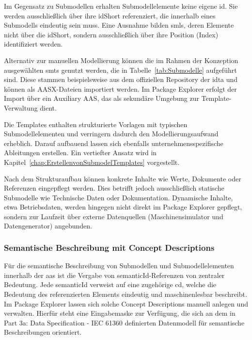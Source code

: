 Im Gegensatz zu Submodellen erhalten Submodellelemente keine eigene \acs{id}.
Sie werden ausschließlich über ihre idShort referenziert, die innerhalb eines Submodells eindeutig sein muss.
Eine Ausnahme bilden \acsp{sml}, deren Elemente nicht über die idShort, sondern ausschließlich über ihre Position (Index) identifiziert werden.

Alternativ zur manuellen Modellierung können die im Rahmen der Konzeption ausgewählten \acsp{smt} genutzt werden, die in Tabelle~\ref{tab:Submodelle} aufgeführt sind.
Diese stammen beispielsweise aus dem offiziellen Repository der \acs{idta} \cite{idtaTemplates} und können als AASX-Dateien importiert werden.
Im Package Explorer erfolgt der Import über ein Auxiliary AAS, das als sekundäre Umgebung zur Template-Verwaltung dient.

Die Templates enthalten strukturierte Vorlagen mit typischen Submodellelementen und verringern dadurch den Modellierungsaufwand erheblich.
Darauf aufbauend lassen sich ebenfalls unternehmensspezifische Ableitungen erstellen.
Ein vertiefter Ansatz wird in Kapitel~\ref{chap:ErstellenvonSubmodelTemplates} vorgestellt.

Nach dem Strukturaufbau können konkrete Inhalte wie Werte, Dokumente oder Referenzen eingepflegt werden.
Dies betrifft jedoch ausschließlich statische Submodelle wie Technische Daten oder Dokumentation.
Dynamische Inhalte, etwa Betriebsdaten, werden hingegen nicht direkt im Package Explorer gepflegt, sondern zur Laufzeit über externe Datenquellen (Maschinensimulator und Datengenerator) angebunden.

\subsubsection*{Semantische Beschreibung mit Concept Descriptions}

Für die semantische Beschreibung von Submodellen und Submodellelementen innerhalb der \acs{aas} ist die Vergabe von semanticId-Referenzen von zentraler Bedeutung.
Jede \mbox{semanticId} verweist auf eine zugehörige \acs{cd}, welche die Bedeutung des referenzierten Elements eindeutig und maschinenlesbar beschreibt.
Im Package Explorer lassen sich solche Concept Descriptions manuell anlegen und verwalten.
Hierfür steht eine Eingabemaske zur Verfügung, die sich an dem in Part 3a: Data Specification - IEC 61360 \cite{SpezifikationPart3a} definierten Datenmodell für semantische Beschreibungen orientiert.


